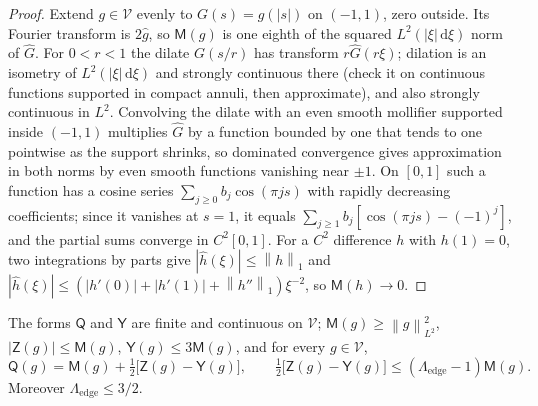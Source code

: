 \documentclass{siamart251216}
\newcommand{\norm}[1]{\left\lVert#1\right\rVert}
\newcommand{\dd}{\,\mathrm d}
\begin{document}
\begin{proof}
Extend $g\in\mathcal V$ evenly to $G(s)=g(|s|)$ on $(-1,1)$, zero outside.
Its Fourier transform is $2\widehat g$, so $\mathsf M(g)$ is one eighth of
the squared $L^2(|\xi|\dd\xi)$ norm of $\widehat G$. For $0<r<1$ the dilate
$G(s/r)$ has transform $r\widehat G(r\xi)$; dilation is an isometry of
$L^2(|\xi|\dd\xi)$ and strongly continuous there (check it on continuous
functions supported in compact annuli, then approximate), and also strongly
continuous in $L^2$. Convolving the dilate with an even smooth mollifier
supported inside $(-1,1)$ multiplies $\widehat G$ by a function bounded by
one that tends to one pointwise as the support shrinks, so dominated
convergence gives approximation in both norms by even smooth functions
vanishing near $\pm1$. On $[0,1]$ such a function has a cosine series
$\sum_{j\ge0}b_j\cos(\pi js)$ with rapidly decreasing coefficients; since
it vanishes at $s=1$, it equals $\sum_{j\ge1}b_j[\cos(\pi js)-(-1)^j]$, and
the partial sums converge in $C^2[0,1]$. For a $C^2$ difference $h$ with
$h(1)=0$, two integrations by parts give
$|\widehat h(\xi)|\le\norm h_1$ and
$|\widehat h(\xi)|\le(|h'(0)|+|h'(1)|+\norm{h''}_1)\xi^{-2}$, so
$\mathsf M(h)\to0$.
\end{proof}

\begin{lemma}\label{lem:continuum}
The forms $\mathsf Q$ and $\mathsf Y$ are finite and continuous on
$\mathcal V$; $\mathsf M(g)\ge\norm g_{L^2}^2$, $|\mathsf Z(g)|\le\mathsf M(g)$,
$\mathsf Y(g)\le3\mathsf M(g)$, and for every $g\in\mathcal V$,
\begin{equation}\label{eq:continuum}
 \mathsf Q(g)=\mathsf M(g)+\tfrac12\bigl[\mathsf Z(g)-\mathsf Y(g)\bigr],
 \qquad
 \tfrac12\bigl[\mathsf Z(g)-\mathsf Y(g)\bigr]\le(\Lambda_{\mathrm{edge}}-1)\mathsf M(g).
\end{equation}
Moreover $\Lambda_{\mathrm{edge}}\le3/2$.
\end{lemma}
\end{document}
